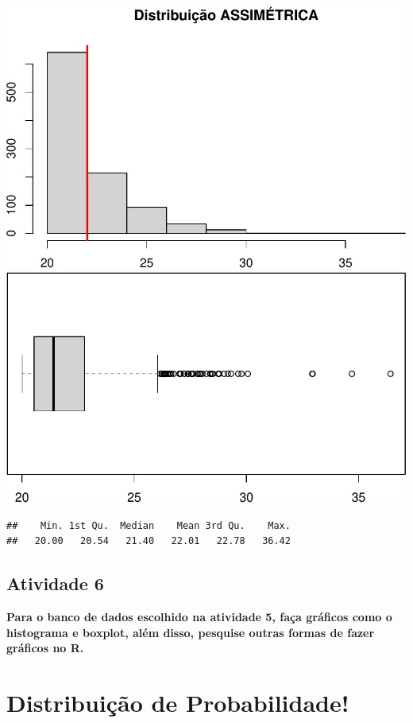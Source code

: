 \documentclass[
]{book}
\begin{document}
\includegraphics{Livro-Estatistica+R_files/figure-latex/unnamed-chunk-22-1.pdf} \includegraphics{Livro-Estatistica+R_files/figure-latex/unnamed-chunk-22-2.pdf}

\begin{verbatim}
##    Min. 1st Qu.  Median    Mean 3rd Qu.    Max. 
##   20.00   20.54   21.40   22.01   22.78   36.42
\end{verbatim}

\section{Atividade 6}\label{atividade-6}

\textbf{Para o banco de dados escolhido na atividade 5, faça gráficos como o histograma e boxplot, além disso, pesquise outras formas de fazer gráficos no R.}

\chapter{Distribuição de Probabilidade!}\label{distribuiuxe7uxe3o-de-probabilidade}
\end{document}
